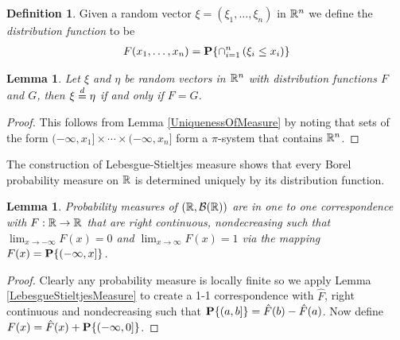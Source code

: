 \documentclass{amsart}
\newtheorem{lem}[thm]{Lemma}
\theoremstyle{remark}
\theoremstyle{definition}
\newtheorem{defn}[thm]{Definition}
\begin{document}
\begin{defn}Given a random vector $\xi = (\xi_1, \dots, \xi_n)$ in
  $\mathbb{R}^n$ we define the \emph{distribution function} to be 
\begin{align*}
F(x_1, \dots, x_n) = \textbf{P}\{\cap_{i=1}^n \left ( \xi_i \leq x_i
    \right ) \}
\end{align*}
\end{defn}
\begin{lem}\label{DistributionFunctionCharacterizeProbability}Let $\xi$ and $\eta$ be random vectors in $\mathbb{R}^n$ with
  distribution functions $F$ and $G$, then
  $\xi \overset{d}= \eta$ if and only if $F = G$.
\end{lem}
\begin{proof}This follows from Lemma \ref{UniquenessOfMeasure} by
  noting
  that sets of the form $(-\infty, x_1] \times \cdots \times (-\infty,
  x_n]$ form a $\pi$-system that contains $\mathbb{R}^n$.
\end{proof}

The construction of Lebesgue-Stieltjes measure shows that every
Borel probability measure on $\mathbb{R}$ is determined uniquely by its distribution function.
\begin{lem}Probability measures of $(\mathbb{R}, \mathcal{B}(\mathbb{R}))$ are
  in one to one correspondence with $F : \mathbb{R} \to \mathbb{R}$ that are
  right continuous, nondecreasing such that $\lim_{x \to -\infty} F(x)
  = 0$ and $\lim_{x \to \infty} F(x) = 1$ via the mapping $F(x) =
  \textbf{P}\{(-\infty, x]\}$.
\end{lem}
\begin{proof}Clearly any probability measure is locally finite so we
  apply Lemma \ref{LebesgueStieltjesMeasure} to create a 1-1
  correspondence with $\hat{F}$, 
  right continuous and nondecreasing such that $\textbf{P}\{(a,b]\} =
  \hat{F}(b) - \hat{F}(a)$.  Now define $F(x) = \hat{F}(x) +
  \textbf{P}\{(-\infty, 0]\}$.
\end{proof}
\end{document}
